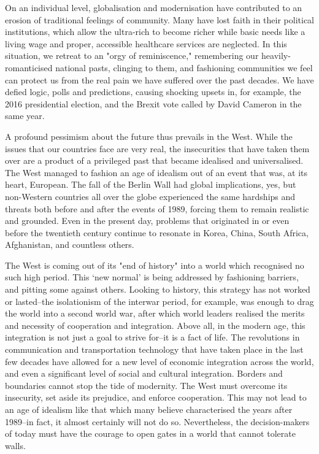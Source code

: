    On an individual level, globalisation and modernisation have
   contributed to an erosion of traditional feelings of community. Many
   have lost faith in their political institutions, which allow the
   ultra-rich to become richer while basic needs like a living wage and
   proper, accessible healthcare services are neglected. In this
   situation, we retreat to an "orgy of reminiscence," remembering our
   heavily-romanticised national pasts, clinging to them, and fashioning
   communities we feel can protect us from the real pain we have suffered
   over the past decades. We have defied logic, polls and predictions,
   causing shocking upsets in, for example, the 2016 presidential
   election, and the Brexit vote called by David Cameron in the same
   year.

   A profound pessimism about the future thus prevails in the West. While
   the issues that our countries face are very real, the insecurities that
   have taken them over are a product of a privileged past that became
   idealised and universalised. The West managed to fashion an age of
   idealism out of an event that was, at its heart, European. The fall of
   the Berlin Wall had global implications, yes, but non-Western countries
   all over the globe experienced the same hardships and threats both
   before and after the events of 1989, forcing them to remain realistic
   and grounded. Even in the present day, problems that originated in or
   even before the twentieth century continue to resonate in Korea, China,
   South Africa, Afghanistan, and countless others.

   The West is coming out of its "end of history" into a world which
   recognised no such high period. This `new normal' is being addressed by
   fashioning barriers, and pitting some against others. Looking to
   history, this strategy has not worked or lasted--the isolationism of
   the interwar period, for example, was enough to drag the world into a
   second world war, after which world leaders realised the merits and
   necessity of cooperation and integration. Above all, in the modern age,
   this integration is not just a goal to strive for--it is a fact of
   life. The revolutions in communication and transportation technology
   that have taken place in the last few decades have allowed for a new
   level of economic integration across the world, and even a significant
   level of social and cultural integration. Borders and boundaries cannot
   stop the tide of modernity. The West must overcome its insecurity, set
   aside its prejudice, and enforce cooperation. This may not lead to an
   age of idealism like that which many believe characterised the years
   after 1989--in fact, it almost certainly will not do so. Nevertheless,
   the decision-makers of today must have the courage to open gates in a
   world that cannot tolerate walls.


